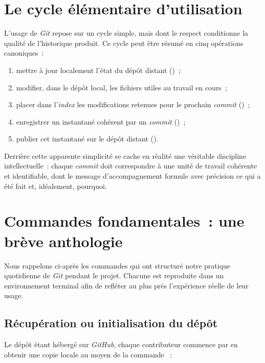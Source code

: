 \documentclass[12pt, a4paper, openany]{report}
\begin{document}
	\section{Le cycle élémentaire d’utilisation}

	L’usage de \textit{Git} repose sur un cycle simple, mais dont le respect conditionne la qualité de l’historique produit. Ce cycle peut être résumé en cinq opérations canoniques~:

	\begin{enumerate}
		\item mettre à jour localement l’état du dépôt distant ()~;
		\item modifier, dans le dépôt local, les fichiers utiles au travail en cours~;
		\item placer dans l’\emph{index} les modifications retenues pour le prochain \textit{commit} ()~;
		\item enregistrer un instantané cohérent par un \textit{commit} ()~;
		\item publier cet instantané sur le dépôt distant ().
	\end{enumerate}

	Derrière cette apparente simplicité se cache en réalité une véritable discipline intellectuelle~: chaque \textit{commit} doit correspondre à une unité de travail cohérente et identifiable, dont le message d’accompagnement formule avec précision ce qui a été fait et, idéalement, pourquoi.
	
	\section{Commandes fondamentales~: une brève anthologie}

	Nous rappelons ci-après les commandes qui ont structuré notre pratique quotidienne de \textit{Git} pendant le projet. Chacune est reproduite dans un environnement terminal afin de refléter au plus près l’expérience réelle de leur usage.

	\subsection{Récupération ou initialisation du dépôt}

	Le dépôt étant hébergé sur \textit{GitHub}, chaque contributeur commence par en obtenir une copie locale au moyen de la commande ~:
\end{document}
